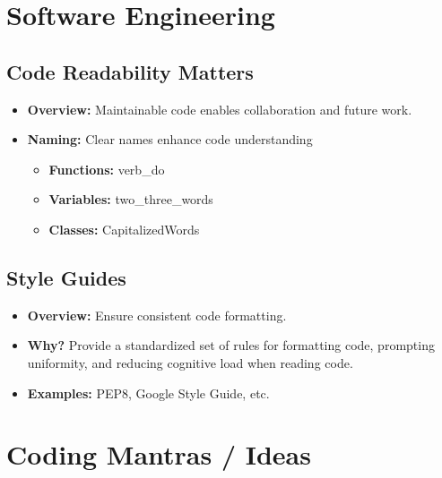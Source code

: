 \section{Software Engineering}

\subsection{Code Readability Matters}
\begin{notes}
    \begin{itemize}
        \item \textbf{Overview:} Maintainable code enables collaboration and future work.
        \item \textbf{Naming:} Clear names enhance code understanding 
        \begin{itemize}
            \item \textbf{Functions:} verb\_do
            \item \textbf{Variables:} two\_three\_words
            \item \textbf{Classes:} CapitalizedWords
        \end{itemize}
    \end{itemize}
\end{notes}

\subsection{Style Guides}
\begin{notes}
    \begin{itemize}
        \item \textbf{Overview:} Ensure consistent code formatting. 
        \item \textbf{Why?} Provide a standardized set of rules for formatting code, prompting uniformity, and reducing cognitive load when reading code. 
        \item \textbf{Examples:} PEP8, Google Style Guide, etc.
    \end{itemize}
\end{notes}
\newpage

\section{Coding Mantras / Ideas}
